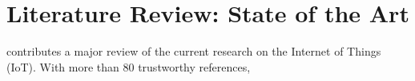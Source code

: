 \section{Literature Review: State of the Art}

\textcite{xu-he-li:internet-of-things-in-industries-a-survery:2014} contributes a major review of the current research on the Internet of Things (IoT). With more than 80 trustworthy references, 
